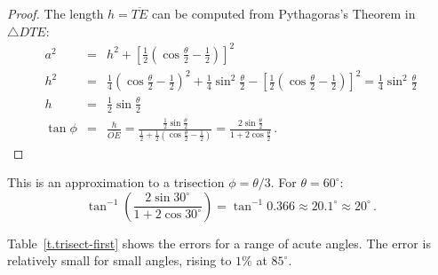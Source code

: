 \begin{proof}
\newpage

The length $h=\overline{TE}$ can be computed from Pythagoras's Theorem in $\triangle DTE$:
\begin{eqnarray*}
a^2 &=& h^2 + \left[\frac{1}{2}\left(\cos \frac{\theta}{2}-\frac{1}{2}\right)\right]^2\\
h^2&=&\frac{1}{4}\left(\cos \frac{\theta}{2}-\frac{1}{2}\right)^2+\frac{1}{4}\sin^2\frac{\theta}{2}-\left[\frac{1}{2}\left(\cos \frac{\theta}{2}-\frac{1}{2}\right)\right]^2=
\frac{1}{4}\sin^2\frac{\theta}{2}\\
h&=&\frac{1}{2}\sin\frac{\theta}{2}\\
\tan\phi &=&\frac{h}{\overline{OE}}=\displaystyle\frac{\displaystyle\frac{1}{2}\sin\frac{\theta}{2}}{\displaystyle\frac{1}{2}+\frac{1}{2}\left(\cos \frac{\theta}{2}\! -\! \frac{1}{2}\right)}
=\frac{\displaystyle2\sin\frac{\theta}{2}}{\displaystyle 1+2\cos\frac{\theta}{2}}\,.
\end{eqnarray*}                  
\end{proof}

This is an approximation to a trisection $\phi=\theta/3$. For $\theta=60^\circ$:
\[
\tan^{-1}\left(\frac{2\sin 30^\circ}{1+2\cos 30^\circ}\right)=
\tan^{-1}0.366\approx 20.1^\circ\approx 20^\circ\,.
\]

Table~\ref{t.trisect-first} shows the errors for a range of acute angles. The error is relatively small for small angles, rising to $1\%$ at $85^\circ$.

